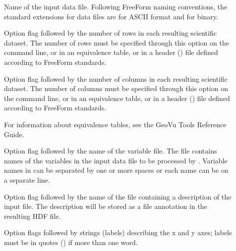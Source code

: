 \begin{description}

\item[]
  
  Name of the input data file. Following FreeForm naming conventions,
  the standard extensions for data files are  for ASCII
  format and  for binary.

\item[\hdfr]
  
  Option flag followed by the number of rows in each resulting
  scientific dataset. The number of rows must be specified through
  this option on the command line, or in an equivalence table, or in a
  header () file defined according to FreeForm standards.

\item[\hdfc]
  
  Option flag followed by the number of columns in each resulting
  scientific dataset. The number of columns must be specified through
  this option on the command line, or in an equivalence table, or in a
  header () file defined according to FreeForm standards.
  
  For information about equivalence tables, see the GeoVu Tools
  Reference Guide.

\item[\hdfv]
  
  Option flag followed by the name of the variable file. The file
  contains names of the variables in the input data file to be
  processed by . Variable names in  can be
  separated by one or more spaces or each name can be on a separate
  line.

\item[\hdfd]
  
  Option flag followed by the name of the file containing a
  description of the input file. The description will be stored as a
  file annotation in the resulting HDF file.

\item[\hdfxy]
  
  Option flags followed by strings (labels) describing the x and y
  axes; labels must be in quotes () if more than one word.

\item[\hdfxuyu]
  

\end{description}
